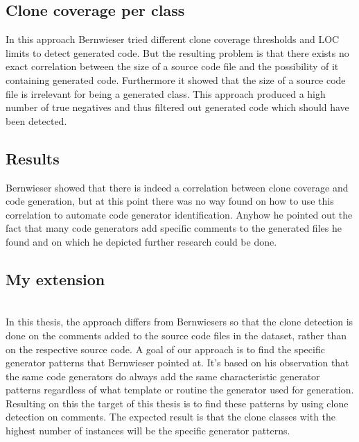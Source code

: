 \subsection{Clone coverage per class}
In this approach Bernwieser tried different clone coverage thresholds and LOC limits to detect generated code. But the resulting problem is that there exists no exact correlation between the size of a source code file and the possibility of it containing generated code. Furthermore it showed that the size of a source code file is irrelevant for being a generated class. This approach produced a high number of true negatives and thus filtered out generated code which should have been detected.

\subsection{Results}
Bernwieser showed that there is indeed a correlation between clone coverage and code generation, but at this point there was no way found on how to use this correlation to automate code generator identification. Anyhow he pointed out the fact that many code generators add specific comments to the generated files he found and on which he depicted further research could be done.

\subsection{My extension}
\\
In this thesis, the approach differs from Bernwiesers so that the clone detection is done on the comments added to the source code files in the dataset, rather than on the respective source code. A goal of our approach is to find the specific generator patterns that Bernwieser pointed at. It's based on his observation that the same code generators do always add the same characteristic generator patterns regardless of what template or routine the generator used for generation. Resulting on this the target of this thesis is to find these patterns by using clone detection on comments. The expected result is that the clone classes with the highest number of instances will be the specific generator patterns.

